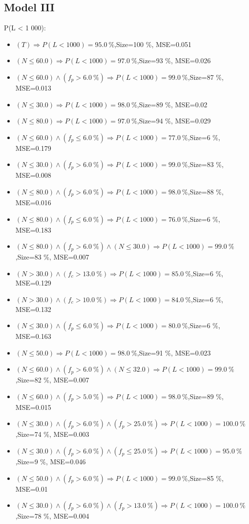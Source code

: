 \documentclass[numbered]{CSL}
\begin{document}
\subsection{Model III}
P(L < 1 000):
\begin{itemize}
\item $(T) \Rightarrow P(L < 1 000) = 95.0~\%$,\hfill Size=100 \%, MSE=0.051
\item $(N \leq 60.0) \Rightarrow P(L < 1 000) = 97.0~\%$,\hfill Size=93 \%, MSE=0.026
\item $(N \leq 60.0) \land (f_p > 6.0~\%) \Rightarrow P(L < 1 000) = 99.0~\%$,\hfill Size=87 \%, MSE=0.013
\item $(N \leq 30.0) \Rightarrow P(L < 1 000) = 98.0~\%$,\hfill Size=89 \%, MSE=0.02
\item $(N \leq 80.0) \Rightarrow P(L < 1 000) = 97.0~\%$,\hfill Size=94 \%, MSE=0.029
\item $(N \leq 60.0) \land (f_p \leq 6.0~\%) \Rightarrow P(L < 1 000) = 77.0~\%$,\hfill Size=6 \%, MSE=0.179
\item $(N \leq 30.0) \land (f_p > 6.0~\%) \Rightarrow P(L < 1 000) = 99.0~\%$,\hfill Size=83 \%, MSE=0.008
\item $(N \leq 80.0) \land (f_p > 6.0~\%) \Rightarrow P(L < 1 000) = 98.0~\%$,\hfill Size=88 \%, MSE=0.016
\item $(N \leq 80.0) \land (f_p \leq 6.0~\%) \Rightarrow P(L < 1 000) = 76.0~\%$,\hfill Size=6 \%, MSE=0.183
\item $(N \leq 80.0) \land (f_p > 6.0~\%) \land (N \leq 30.0) \Rightarrow P(L < 1 000) = 99.0~\%$,\hfill Size=83 \%, MSE=0.007
\item $(N > 30.0) \land (f_c > 13.0~\%) \Rightarrow P(L < 1 000) = 85.0~\%$,\hfill Size=6 \%, MSE=0.129
\item $(N > 30.0) \land (f_c > 10.0~\%) \Rightarrow P(L < 1 000) = 84.0~\%$,\hfill Size=6 \%, MSE=0.132
\item $(N \leq 30.0) \land (f_p \leq 6.0~\%) \Rightarrow P(L < 1 000) = 80.0~\%$,\hfill Size=6 \%, MSE=0.163
\item $(N \leq 50.0) \Rightarrow P(L < 1 000) = 98.0~\%$,\hfill Size=91 \%, MSE=0.023
\item $(N \leq 60.0) \land (f_p > 6.0~\%) \land (N \leq 32.0) \Rightarrow P(L < 1 000) = 99.0~\%$,\hfill Size=82 \%, MSE=0.007
\item $(N \leq 60.0) \land (f_p > 5.0~\%) \Rightarrow P(L < 1 000) = 98.0~\%$,\hfill Size=89 \%, MSE=0.015
\item $(N \leq 30.0) \land (f_p > 6.0~\%) \land (f_p > 25.0~\%) \Rightarrow P(L < 1 000) = 100.0~\%$,\hfill Size=74 \%, MSE=0.003
\item $(N \leq 30.0) \land (f_p > 6.0~\%) \land (f_p \leq 25.0~\%) \Rightarrow P(L < 1 000) = 95.0~\%$,\hfill Size=9 \%, MSE=0.046
\item $(N \leq 50.0) \land (f_p > 6.0~\%) \Rightarrow P(L < 1 000) = 99.0~\%$,\hfill Size=85 \%, MSE=0.01
\item $(N \leq 30.0) \land (f_p > 6.0~\%) \land (f_p > 13.0~\%) \Rightarrow P(L < 1 000) = 100.0~\%$,\hfill Size=78 \%, MSE=0.004
\end{itemize}
\end{document}
